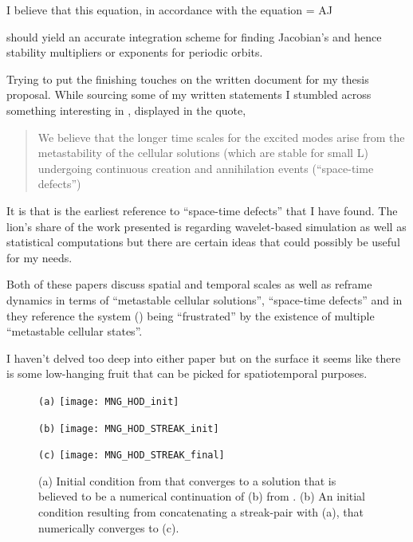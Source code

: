 \begin{itemize}
I believe that this equation, in accordance with the equation
\beq
{} = AJ
\eeq

should yield an accurate integration scheme for finding Jacobian's and hence stability multipliers
or exponents for periodic orbits.


Trying to put the finishing touches on the written document for my thesis proposal.
While sourcing some of my written statements I stumbled across something interesting
in , displayed in the quote,

\begin{quote}
We believe that the longer time scales for the excited modes arise from the metastability
of the cellular solutions (which are stable for small L) undergoing continuous creation
and annihilation events (``space-time defects'')
\end{quote}

It is  that is the earliest reference to ``space-time defects'' that I have
found. The lion's share of the work presented is regarding wavelet-based simulation
as well as statistical computations but there are certain ideas that could possibly
be useful for my needs.

Both of these papers discuss spatial and temporal scales as well as reframe
dynamics in terms of ``metastable cellular solutions'', ``space-time defects'' and
in  they reference the system (\KSe) being ``frustrated'' by the existence
of multiple ``metastable cellular states''.

I haven't delved too deep into either paper but on the surface it seems like there
is some low-hanging fruit that can be picked for spatiotemporal purposes.

\begin{figure}
\begin{minipage}[height=.3\textheight]{.32\textwidth}
\centering \small{\texttt{(a)}}
\texttt{[image: MNG\_HOD\_init]}
\end{minipage}
\begin{minipage}[height=.3\textheight]{.32\textwidth}
\centering \small{\texttt{(b)}}
\texttt{[image: MNG\_HOD\_STREAK\_init]}
\end{minipage}
\begin{minipage}[height=.3\textheight]{.32\textwidth}
\centering \small{\texttt{(c)}}
\texttt{[image: MNG\_HOD\_STREAK\_final]}
\end{minipage}
\caption{ \label{fig:MNGhodstreak}
(a) Initial condition from  that converges to
a solution that is believed to be a numerical continuation of (b) from . (b) An initial condition
resulting from concatenating a streak-pair with (a), that
numerically converges to (c).
}
\end{figure}


\end{itemize}
